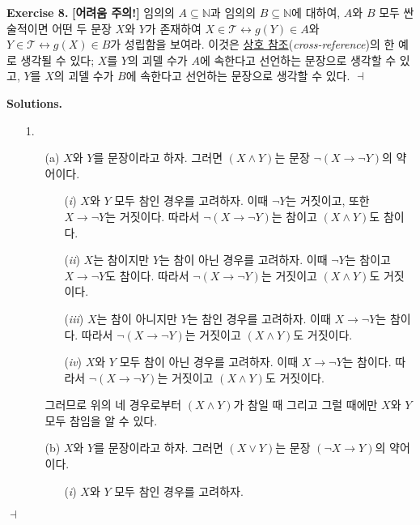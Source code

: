 \documentclass[12pt]{paper}
\newenvironment{context}[1][]
{ \noindent \textbf{{#1}.} }
{ \hfill $ \dashv $ }
\begin{document}
\begin{context}[Exercise 8]
\textbf{[어려움 주의!]} 임의의 $A \subseteq \mathbb{N}$과 임의의 $B \subseteq \mathbb{N}$에 대하여,
$A$와 $B$ 모두 싼술적이면 어떤 두 문장 $X$와 $Y$가 존재하여 $X \in \mathcal{T} \leftrightarrow g \left( Y \right) \in A$와 $Y \in \mathcal{T} \leftrightarrow g \left( X \right) \in B$가 성립함을 보여라.
이것은 \underline{상호 참조}(\textit{cross-reference})의 한 예로 생각될 수 있다;
$X$를 $Y$의 괴델 수가 $A$에 속한다고 선언하는 문장으로 생각할 수 있고,
$Y$를 $X$의 괴델 수가 $B$에 속한다고 선언하는 문장으로 생각할 수 있다.
\end{context}

\begin{context}[Solutions]
\begin{enumerate}
\item[{1.}]
\begin{itemize}
\item[(a)] $X$와 $Y$를 문장이라고 하자.
그러면 $\left( X \land Y \right)$는 문장 $\lnot \left( X \rightarrow \lnot Y \right)$의 약어이다.
\begin{enumerate}
\item[(\textit{i})] $X$와 $Y$ 모두 참인 경우를 고려하자.
이때 $\lnot Y$는 거짓이고, 또한 $X \rightarrow \lnot Y$는 거짓이다.
따라서 $\lnot \left( X \rightarrow \lnot Y \right)$는 참이고 $\left( X \land Y \right)$도 참이다.
\item[(\textit{ii})] $X$는 참이지만 $Y$는 참이 아닌 경우를 고려하자.
이때 $\lnot Y$는 참이고 $X \rightarrow \lnot Y$도 참이다.
따라서 $\lnot \left( X \rightarrow \lnot Y \right)$는 거짓이고 $\left( X \land Y \right)$도 거짓이다.
\item[(\textit{iii})] $X$는 참이 아니지만 $Y$는 참인 경우를 고려하자.
이때 $X \rightarrow \lnot Y$는 참이다.
따라서 $\lnot \left( X \rightarrow \lnot Y \right)$는 거짓이고 $\left( X \land Y \right)$도 거짓이다.
\item[(\textit{iv})] $X$와 $Y$ 모두 참이 아닌 경우를 고려하자.
이때 $X \rightarrow \lnot Y$는 참이다.
따라서 $\lnot \left( X \rightarrow \lnot Y \right)$는 거짓이고 $\left( X \land Y \right)$도 거짓이다.
\end{enumerate}
그러므로 위의 네 경우로부터 $\left( X \land Y \right)$가 참일 때 그리고 그럴 때에만 $X$와 $Y$ 모두 참임을 알 수 있다.
\item[(b)] $X$와 $Y$를 문장이라고 하자.
그러면 $\left( X \lor Y \right)$는 문장 $\left( \lnot X \rightarrow Y \right)$의 약어이다.
\begin{enumerate}
\item[(\textit{i})] $X$와 $Y$ 모두 참인 경우를 고려하자.

\end{enumerate}
\end{itemize}
\end{enumerate}
\end{context}
\end{document}
